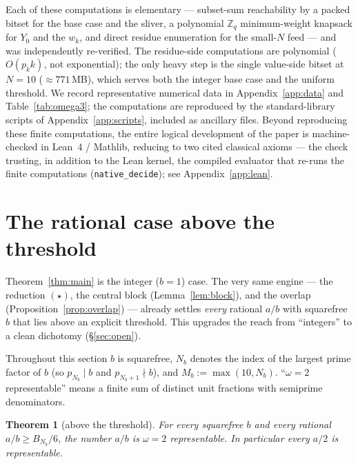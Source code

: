 \documentclass[11pt]{amsart}
\theoremstyle{plain}
\newtheorem{theorem}{Theorem}[section]
\theoremstyle{definition}
\newcommand{\Z}{\mathbb{Z}}
\begin{document}
Each of these computations is elementary --- subset-sum reachability by a packed
bitset for the base case and the sliver, a polynomial $\Z_q$ minimum-weight
knapsack for $Y_0$ and the $w_k$, and direct residue enumeration for the small-$N$
feed --- and was independently re-verified.  The residue-side computations are
polynomial ($O(p_k k)$, not exponential); the only heavy step is the single
value-side bitset at $N=10$ ($\approx771$\,MB), which serves both the integer base
case and the uniform threshold.  We record representative numerical data in
Appendix~\ref{app:data} and Table~\ref{tab:omega3}; the computations are reproduced
by the standard-library scripts of Appendix~\ref{app:scripts}, included as ancillary
files.  Beyond reproducing these finite computations, the entire logical development of
the paper is machine-checked in Lean~4 / Mathlib, reducing to two cited classical axioms
--- the check trusting, in addition to the Lean kernel, the compiled evaluator that
re-runs the finite computations (\texttt{native\_decide}); see Appendix~\ref{app:lean}.

\section{The rational case above the threshold}\label{sec:rational}\label{sec:A}

Theorem~\ref{thm:main} is the integer ($b=1$) case.  The very same engine --- the
reduction $(\star)$, the central block (Lemma~\ref{lem:block}), and the overlap
(Proposition~\ref{prop:overlap}) --- already settles \emph{every} rational $a/b$
with squarefree $b$ that lies above an explicit threshold.  This upgrades the
reach from ``integers'' to a clean dichotomy (\S\ref{sec:open}).

Throughout this section $b$ is squarefree, $N_b$ denotes the index of the largest
prime factor of $b$ (so $p_{N_b}\mid b$ and $p_{N_b+1}\nmid b$), and
$M_b:=\max(10,N_b)$.  ``$\omega=2$ representable'' means a finite sum of distinct
unit fractions with semiprime denominators.

\begin{theorem}[above the threshold]\label{thm:above}
For every squarefree $b$ and every rational $a/b\ge B_{N_b}/6$, the number $a/b$
is $\omega=2$ representable.  In particular every $a/2$ is representable.
\end{theorem}
\end{document}
